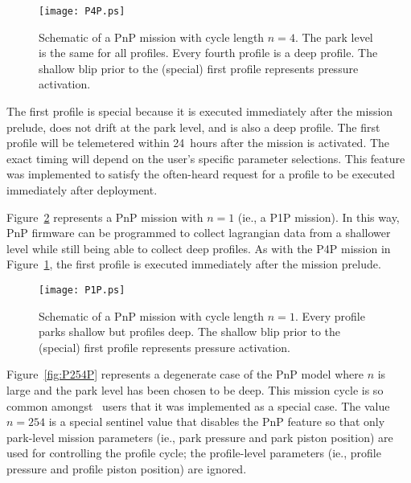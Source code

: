 \begin{figure}[htbp]
  \begin{center}
    \leavevmode
    \mbox{\texttt{[image: P4P.ps]}}
    \caption{Schematic of a PnP mission with cycle length $n=4$.  The park
      level is the same for all profiles.  Every fourth profile is a deep
      profile.  The shallow blip prior to the (special) first profile
      represents pressure activation.}
    \label{fig:P4P}
  \end{center}
\end{figure}

The first profile is special because it is executed immediately after the
mission prelude, does not drift at the park level, and is also a deep
profile.  The first profile will be telemetered within 24~hours after the
mission is activated.  The exact timing will depend on the user's specific
parameter selections.  This feature was implemented to satisfy the
often-heard request for a profile to be executed immediately after
deployment.

Figure~\ref{fig:P1P} represents a PnP mission with $n=1$ (ie., a P1P mission).
In this way, PnP firmware can be programmed to collect lagrangian data from
a shallower level while still being able to collect deep profiles.  As with
the P4P mission in Figure~\ref{fig:P4P}, the first profile is executed
immediately after the mission prelude.

\begin{figure}[htbp]
  \begin{center}
    \leavevmode
    \mbox{\texttt{[image: P1P.ps]}}
    \caption{Schematic of a PnP mission with cycle length $n=1$.  Every
      profile parks shallow but profiles deep.  The shallow blip prior to
      the (special) first profile represents pressure activation.}
    \label{fig:P1P}
  \end{center}
\end{figure}

Figure~\ref{fig:P254P} represents a degenerate case of the PnP model where
$n$ is large and the park level has been chosen to be deep.  This mission
cycle is so common amongst \apex\ users that it was implemented as a special
case.  The value $n=254$ is a special sentinel value that disables the PnP
feature so that only park-level mission parameters (ie., park pressure and
park piston position) are used for controlling the profile cycle; the
profile-level parameters (ie., profile pressure and profile piston position)
are ignored.

